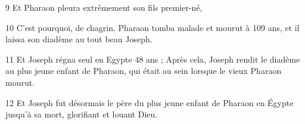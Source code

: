 \par 9 Et Pharaon pleura extrêmement son fils premier-né,

\par 10 C'est pourquoi, de chagrin, Pharaon tomba malade et mourut à 109 ans, et il laissa son diadème au tout beau Joseph.

\par 11 Et Joseph régna seul en Egypte 48 ans ; Après cela, Joseph rendit le diadème au plus jeune enfant de Pharaon, qui était au sein lorsque le vieux Pharaon mourut.

\par 12 Et Joseph fut désormais le père du plus jeune enfant de Pharaon en Égypte jusqu'à sa mort, glorifiant et louant Dieu.


